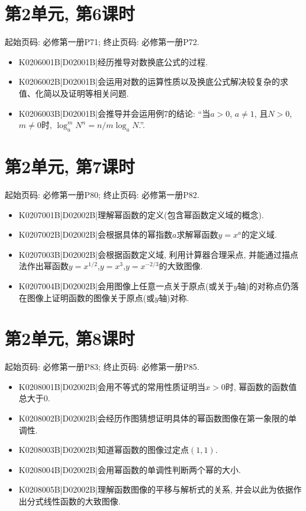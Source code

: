 \section*{第2单元, 第6课时}
起始页码: 必修第一册P71; 终止页码: 必修第一册P72.
\begin{itemize}
\item K0206001B|D02001B|经历推导对数换底公式的过程.
\item K0206002B|D02001B|会运用对数的运算性质以及换底公式解决较复杂的求值、化简以及证明等相关问题.
\item K0206003B|D02001B|会推导并会运用例7的结论: ``当$a>0$, $a\neq1$, 且$N>0$, $m\neq0$时, $\log_a^{m}N^{n}=n/m\log_aN$.''.
\end{itemize}

\section*{第2单元, 第7课时}
起始页码: 必修第一册P80; 终止页码: 必修第一册P82.
\begin{itemize}
\item K0207001B|D02002B|理解幂函数的定义(包含幂函数定义域的概念).
\item K0207002B|D02002B|会根据具体的幂指数$a$求解幂函数$y=x^{a}$的定义域.
\item K0207003B|D02002B|会根据函数定义域, 利用计算器合理采点, 并能通过描点法作出幂函数$y=x^{1/2}$,$y=x^{3}$,$y=x^{-2/3}$的大致图像.
\item K0207004B|D02002B|会用图像上任意一点关于原点(或关于$y$轴)的对称点仍落在图像上证明函数的图像关于原点(或$y$轴)对称.
\end{itemize}

\section*{第2单元, 第8课时}
起始页码: 必修第一册P83; 终止页码: 必修第一册P85.
\begin{itemize}
\item K0208001B|D02002B|会用不等式的常用性质证明当$x>0$时, 幂函数的函数值总大于$0$.
\item K0208002B|D02002B|会经历作图猜想证明具体的幂函数图像在第一象限的单调性.
\item K0208003B|D02002B|知道幂函数的图像过定点$(1,1)$.
\item K0208004B|D02002B|会用幂函数的单调性判断两个幂的大小.
\item K0208005B|D02002B|理解函数图像的平移与解析式的关系, 并会以此为依据作出分式线性函数的大致图像.
\end{itemize}

